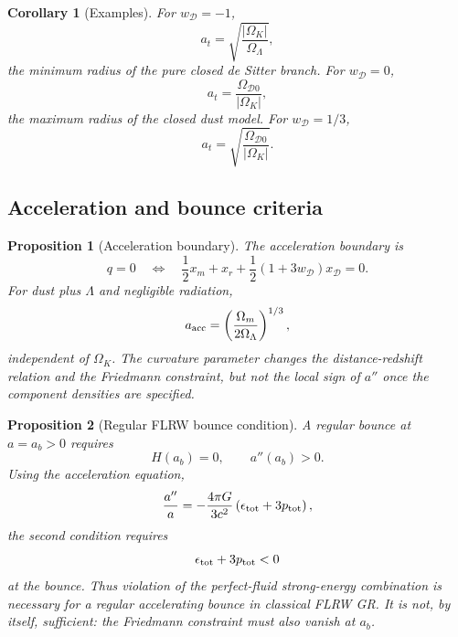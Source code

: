 \documentclass[
  aps,
  prd,
  reprint,
  superscriptaddress,
  nofootinbib,
  floatfix,
  longbibliography
]{revtex4-2}
\newtheorem{proposition}{Proposition}
\newtheorem{corollary}{Corollary}
\newcommand{\D}{\mathcal D}
\begin{document}
\begin{corollary}[Examples]
For \(w_\D=-1\),
\[
  a_t=\sqrt{\frac{|\Omega_K|}{\Omega_\Lambda}},
\]
the minimum radius of the pure closed de Sitter branch.  For \(w_\D=0\),
\[
  a_t=\frac{\Omega_{\D0}}{|\Omega_K|},
\]
the maximum radius of the closed dust model.  For \(w_\D=1/3\),
\[
  a_t=\sqrt{\frac{\Omega_{\D0}}{|\Omega_K|}} .
\]
\end{corollary}

\subsection{Acceleration and bounce criteria}

\begin{proposition}[Acceleration boundary]
\label{prop:acc}
The acceleration boundary is
\begin{equation}
  q=0
  \quad\Longleftrightarrow\quad
  \frac12x_m+x_r+\frac12(1+3w_\D)x_\D=0 .
  \label{eq:acc}
\end{equation}
For dust plus \(\Lambda\) and negligible radiation,
\begin{equation}
  a_{\rm acc}=\left(\frac{\Omega_m}{2\Omega_\Lambda}\right)^{1/3},
  \label{eq:aacc}
\end{equation}
independent of \(\Omega_K\).  The curvature parameter changes the distance-redshift
relation and the Friedmann constraint, but not the local sign of \(a''\) once the
component densities are specified.
\end{proposition}

\begin{proposition}[Regular FLRW bounce condition]
\label{prop:bounce}
A regular bounce at \(a=a_b>0\) requires
\begin{equation}
  H(a_b)=0,\qquad a''(a_b)>0 .
\end{equation}
Using the acceleration equation,
\begin{equation}
  \frac{a''}{a}=-\frac{4\pi G}{3c^2}
  \left(\epsilon_{\rm tot}+3p_{\rm tot}\right),
\end{equation}
the second condition requires
\begin{equation}
  \epsilon_{\rm tot}+3p_{\rm tot}<0
\end{equation}
at the bounce.  Thus violation of the perfect-fluid strong-energy combination is
necessary for a regular accelerating bounce in classical FLRW GR.  It is not,
by itself, sufficient: the Friedmann constraint must also vanish at \(a_b\).
\end{proposition}
\end{document}
